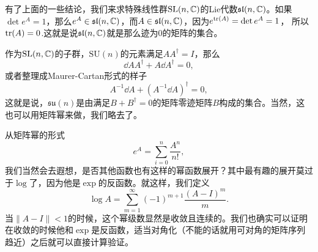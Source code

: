 有了上面的一些结论，我们来求特殊线性群$\mathrm{SL}(n,\mathbb{C})$的Lie代数$\mathfrak{sl}(n,\mathbb{C})$。如果$\det e^A=1$，那么$e^A\in \mathfrak{sl}(n,\mathbb{C})$，而$A \in \mathfrak{sl}(n,\mathbb{C})$，因为$e^{\operatorname{tr}(A)}=\det e^A=1$，
所以$\operatorname{tr}(A)=0$.这就是说$\mathfrak{sl}(n,\mathbb{C})$就是那么迹为0的矩阵的集合。

作为$\mathrm{SL}(n,\mathbb{C})$的子群，$\mathrm{SU}(n)$的元素满足$AA^\dag=I$，那么
\[
	\dd A A^\dag+A\dd A^\dag=0,
\]
或者整理成Maurer-Cartan形式的样子
\[
	A^{-1}\dd A +(A^{-1}\dd A)^\dag=0,
\]
这就是说，$\mathfrak{su}(n)$是由满足$B+B^\dag=0$的矩阵零迹矩阵$B$构成的集合。当然，这也可以用矩阵幂来做，我们略去了。

从矩阵幂的形式
\[
	e^A=\sum_{i=0}^n\frac{A^n}{n!},
\]
我们当然会去遐想，是否其他函数也有这样的幂函数展开？其中最有趣的展开莫过于$\log$了，因为他是$\exp$的反函数。就这样，我们定义
\[
	\log A=\sum_{m=1}^\infty (-1)^{m+1}\frac{(A-I)^m}{m}.
\]
当$\|A-I\|<1$的时候，这个幂级数显然是收敛且连续的。我们也确实可以证明在收敛的时候他和$\exp$是反函数，适当对角化（不能的话就用可对角的矩阵序列趋近）之后就可以直接计算验证。

